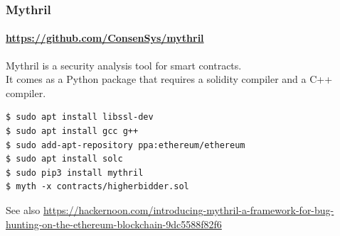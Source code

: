 \begin{frame}[fragile]
	\frametitle{Mythril}
	\framesubtitle{\url{https://github.com/ConsenSys/mythril}}
	Mythril is a security analysis tool for smart contracts.\\
	It comes as a Python package that requires a solidity compiler and a C++ compiler.
	\vspace{1em}
	\begin{Verbatim}[fontsize=\tiny]
$ sudo apt install libssl-dev
$ sudo apt install gcc g++
$ sudo add-apt-repository ppa:ethereum/ethereum
$ sudo apt install solc
$ sudo pip3 install mythril 
$ myth -x contracts/higherbidder.sol 
	\end{Verbatim}
	\vspace{3em}
	{\footnotesize See also \url{https://hackernoon.com/introducing-mythril-a-framework-for-bug-hunting-on-the-ethereum-blockchain-9dc5588f82f6}}
\end{frame}




